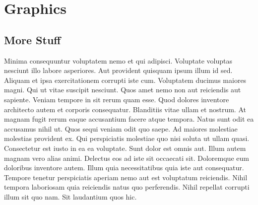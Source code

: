 
\makeatletter\@openrightfalse
\part{Graphics}



\chapter{More Stuff}

Minima consequuntur voluptatem nemo et qui adipisci. Voluptate voluptas
nesciunt illo labore asperiores. Aut provident quisquam ipsum illum id sed.
Aliquam et ipsa exercitationem corrupti iste cum. Voluptatem ducimus maiores
magni. Qui ut vitae suscipit nesciunt. Quos amet nemo non aut reiciendis aut
sapiente. Veniam tempore in sit rerum quam esse. Quod dolores inventore
architecto autem et corporis consequatur. Blanditiis vitae ullam et nostrum. At
magnam fugit rerum eaque accusantium facere atque tempora. Natus sunt odit ea
accusamus nihil ut. Quos sequi veniam odit quo saepe. Ad maiores molestiae
molestias provident ex. Qui perspiciatis molestiae quo nisi soluta ut ullam
quasi. Consectetur est iusto in ea ea voluptate. Sunt dolor est omnis aut.
Illum autem magnam vero alias animi. Delectus eos ad iste sit occaecati sit.
Doloremque eum doloribus inventore autem. Illum quia necessitatibus quia iste
aut consequatur. Tempore tenetur perspiciatis aperiam nemo aut est voluptatum
reiciendis. Nihil tempora laboriosam quia reiciendis natus quo perferendis.
Nihil repellat corrupti illum sit quo nam. Sit laudantium quos hic.

\@openrighttrue\makeatother

